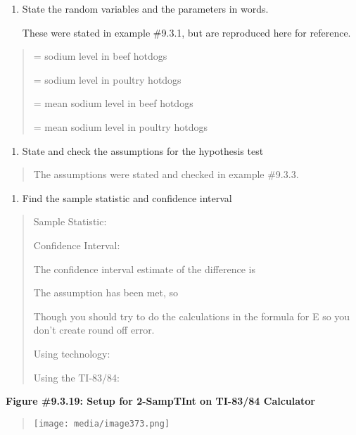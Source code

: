 \documentclass[]{book}
\providecommand{\tightlist}{%
  \setlength{\itemsep}{0pt}\setlength{\parskip}{0pt}}
\begin{document}
\begin{enumerate}
\def\labelenumi{\arabic{enumi}.}
\item
  State the random variables and the parameters in words.

  These were stated in example \#9.3.1, but are reproduced here for
  reference.
\end{enumerate}

\begin{quote}
= sodium level in beef hotdogs

= sodium level in poultry hotdogs

= mean sodium level in beef hotdogs

= mean sodium level in poultry hotdogs
\end{quote}

\begin{enumerate}
\def\labelenumi{\arabic{enumi}.}
\setcounter{enumi}{1}
\tightlist
\item
  State and check the assumptions for the hypothesis test
\end{enumerate}

\begin{quote}
The assumptions were stated and checked in example \#9.3.3.
\end{quote}

\begin{enumerate}
\def\labelenumi{\arabic{enumi}.}
\setcounter{enumi}{2}
\tightlist
\item
  Find the sample statistic and confidence interval
\end{enumerate}

\begin{quote}
Sample Statistic:

Confidence Interval:

The confidence interval estimate of the difference is

The assumption has been met, so

Though you should try to do the calculations in the formula for E so
you don't create round off error.

Using technology:

Using the TI-83/84:
\end{quote}

\textbf{Figure \#9.3.19: Setup for 2-SampTInt on TI-83/84 Calculator}

\begin{quote}
\texttt{[image: media/image373.png]}
\end{quote}
\end{document}
